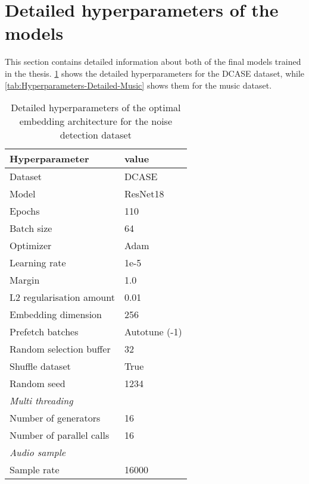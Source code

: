 \section{Detailed hyperparameters of the models}
\label{app:detailed-hyperparameters}
This section contains detailed information about both of the final models trained in the thesis. \ref{tab:Hyperparameters-Detailed-DCASE} shows the detailed hyperparameters for the DCASE dataset, while \ref{tab:Hyperparameters-Detailed-Music} shows them for the music dataset.

\begin{table}[H]
    \centering
    \caption{Detailed hyperparameters of the optimal embedding architecture for the noise detection dataset}
	\label{tab:Hyperparameters-Detailed-DCASE}
    \begin{tabular}{l|l}
        \toprule
        \textbf{Hyperparameter} & \textbf{value} \\ 
        \midrule[1pt]
        Dataset & DCASE \\
        \hline
        Model & ResNet18 \\ 
        \hline
        Epochs & 110 \\ 
        \hline
        Batch size & 64 \\ 
        \hline
        Optimizer & Adam \\ 
        \hline
        Learning rate & 1e-5 \\
        \hline
        Margin & 1.0 \\
        \hline
        L2 regularisation amount & 0.01 \\
        \hline
        Embedding dimension & 256 \\
        \hline
        Prefetch batches & Autotune (-1) \\ 
        \hline
        Random selection buffer & 32 \\ 
        \hline
        Shuffle dataset & True \\
        \hline
        Random seed & 1234 \\
        \midrule[1pt]
        \multicolumn{2}{l}{\textit{Multi threading}} \\
        \midrule[1pt]
        Number of generators & 16 \\ 
        \hline
        Number of parallel calls & 16 \\
        \midrule[1pt]
        \multicolumn{2}{l}{\textit{Audio sample}} \\
        \midrule[1pt]
        Sample rate & 16000 \\ 

\end{tabular}
\end{table}
